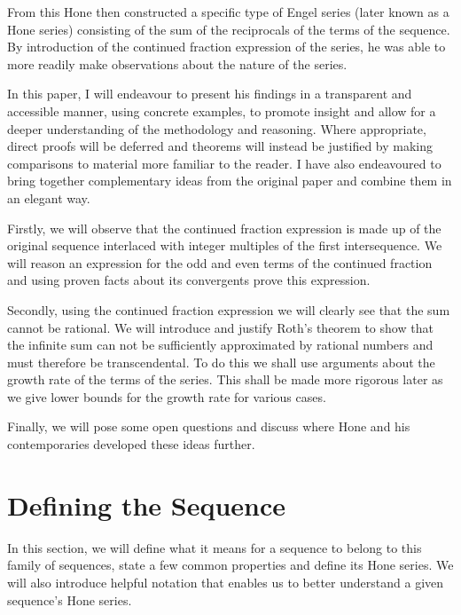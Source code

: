 \documentclass{article}
\theoremstyle{remark}
\theoremstyle{definition}
\begin{document}
From this Hone then constructed a specific type of Engel series (later known as a Hone series) consisting of the sum of the reciprocals of the terms of the sequence. By introduction of the continued fraction expression of the series, he was able to more readily make observations about the nature of the series.

In this paper, I will endeavour to present his findings in a transparent and accessible manner, using concrete examples, to promote insight and allow for a deeper understanding of the methodology and reasoning. Where appropriate, direct proofs will be deferred and theorems will instead be justified by making comparisons to material more familiar to the reader. I have also endeavoured to bring together complementary ideas from the original paper and combine them in an elegant way.

Firstly, we will observe that the continued fraction expression is made up of the original sequence interlaced with integer multiples of the first intersequence. We will reason an expression for the odd and even terms of the continued fraction and using proven facts about its convergents prove this expression.

Secondly, using the continued fraction expression we will clearly see that the sum cannot be rational. We will introduce and justify Roth's theorem to show that the infinite sum can not be sufficiently approximated by rational numbers and must therefore be transcendental. To do this we shall use arguments about the growth rate of the terms of the series. This shall be made more rigorous later as we give lower bounds for the growth rate for various cases.

Finally, we will pose some open questions and discuss where Hone and his contemporaries developed these ideas further.


\newpage

\section{Defining the Sequence}

In this section, we will define what it means for a sequence to belong to this family of sequences, state a few common properties and define its Hone series. We will also introduce helpful notation that enables us to better understand a given sequence's Hone series.
\end{document}
